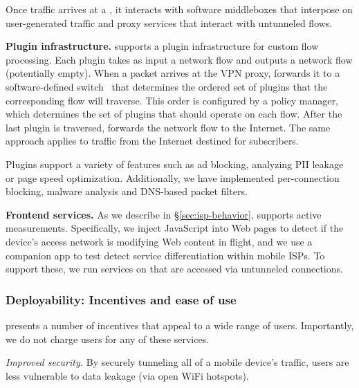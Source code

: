 Once traffic arrives at a \meddlebox, it interacts with software middleboxes that interpose on 
user-generated traffic and proxy services that interact with untunneled  
flows.  

\noindent\textbf{Plugin infrastructure.}
\platname{} supports a plugin
infrastructure for custom flow processing. Each plugin takes as input a 
network flow and outputs a network flow (potentially empty). 
When a packet arrives at the VPN proxy, \meddle forwards it to a software-defined switch~\cite{Openvswitch} that 
determines the ordered set of plugins that the corresponding flow will traverse. 
This order is configured by a policy manager, which determines 
the set of plugins that should operate on each flow. After the last 
plugin is traversed, \meddle forwards the network flow to the Internet. 
The same approach applies to traffic from the Internet destined for \meddle subscribers. 

Plugins support a variety of features such as ad blocking, 
analyzing PII leakage or page speed optimization. Additionally, we have implemented 
per-connection blocking, malware analysis and DNS-based packet filters. 

\noindent\textbf{Frontend services.} As we describe in \S\ref{sec:isp-behavior}, 
\meddle supports active measurements. 
Specifically, we inject JavaScript into Web pages to detect if the device's 
access network is modifying Web content in flight, and we use a companion app to 
test detect service differentiation within mobile ISPs. To support these, we 
run services on \meddle that are accessed via untunneled connections. 

\subsubsection{Deployability: Incentives and ease of use}
\label{subsec:design_deploy}


 \meddle presents a number of incentives 
that appeal to a wide range of users. Importantly, we do not charge users for any of these 
services.

\noindent \emph{Improved security.} By securely tunneling all of a mobile device's traffic, users 
are less vulnerable to data leakage (\eg via open WiFi hotspots). 

